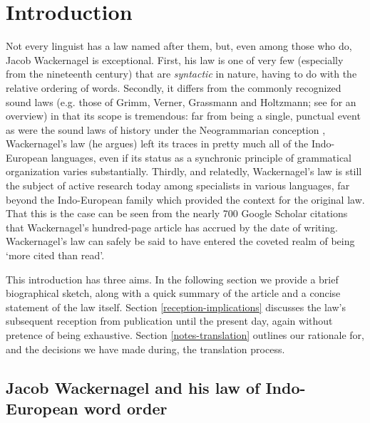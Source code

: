 \chapter{Introduction}
\author{George Walkden}

Not every linguist has a law named after them, but, even among those who do, Jacob Wackernagel is exceptional. First, his law is one of very few (especially from the nineteenth century) that are \emph{syntactic} in nature, having to do with the relative ordering of words. Secondly, it differs from the commonly recognized sound laws (e.g. those of Grimm, Verner, Grassmann and Holtzmann; see \citealp{Collinge1985} for an overview) in that its scope is tremendous: far from being a single, punctual event as were the sound laws of history under the Neogrammarian conception \citep{OsthoffBrugmann1878}, Wackernagel's law (he argues) left its traces in pretty much all of the Indo-European languages, even if its status as a synchronic principle of grammatical organization varies substantially. Thirdly, and relatedly, Wackernagel's law is still the subject of active research today among specialists in various languages, far beyond the Indo-European family which provided the context for the original law. That this is the case can be seen from the nearly 700 Google Scholar citations that Wackernagel's \citeyearpar{Wackernagel1892} hundred-page article has accrued by the date of writing. Wackernagel's law can safely be said to have entered the coveted realm of being `more cited than read'.

This introduction has three aims. In the following section we provide a brief biographical sketch, along with a quick summary of the article and a concise statement of the law itself. Section \ref{reception-implications} discusses the law's subsequent reception from publication until the present day, again without pretence of being exhaustive. Section \ref{notes-translation} outlines our rationale for, and the decisions we have made during, the translation process.

\section{Jacob Wackernagel and his law of Indo-European word order}\label{intro-biography}

